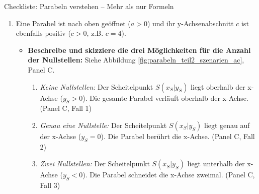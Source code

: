 \begin{loesungsumgebung}{Checkliste: Parabeln verstehen – Mehr als nur Formeln}
\begin{enumerate}[label=\textbf{Teil \arabic*:}]
\begin{enumerate}[label=(\alph*)]
\begin{itemize}
            \item \textbf{Kannst du mit Sicherheit sagen, ob diese Parabel Nullstellen hat?} \\
            \textbf{Ja}, sie muss zwei verschiedene Nullstellen besitzen.
            \textit{Begründung:} Da $a<0$ (nach unten geöffnet) und $f(0)=c=3$ (positiv) ist, liegt der y-Achsenabschnitt oberhalb der x-Achse. Der Scheitelpunkt $S(x_S|y_S)$ als höchster Punkt muss $y_S \ge c = 3$ erfüllen. Da $y_S$ somit positiv ist, muss die nach unten geöffnete Parabel die x-Achse zweimal schneiden.
        \end{itemize}

        \item Eine Parabel ist nach oben geöffnet ($a > 0$) und ihr y-Achsenabschnitt $c$ ist ebenfalls positiv ($c > 0$, z.B. $c=4$).
        \begin{itemize}
            \item \textbf{Beschreibe und skizziere die drei Möglichkeiten für die Anzahl der Nullstellen:} Siehe Abbildung \ref{fig:parabeln_teil2_szenarien_ac}, Panel C.
            \begin{enumerate}
                \item \textit{Keine Nullstellen:} Der Scheitelpunkt $S(x_S|y_S)$ liegt oberhalb der x-Achse ($y_S > 0$). Die gesamte Parabel verläuft oberhalb der x-Achse. (Panel C, Fall 1)
                \item \textit{Genau eine Nullstelle:} Der Scheitelpunkt $S(x_S|y_S)$ liegt genau auf der x-Achse ($y_S = 0$). Die Parabel berührt die x-Achse. (Panel C, Fall 2)
                \item \textit{Zwei Nullstellen:} Der Scheitelpunkt $S(x_S|y_S)$ liegt unterhalb der x-Achse ($y_S < 0$). Die Parabel schneidet die x-Achse zweimal. (Panel C, Fall 3)
            \end{enumerate}


\end{itemize}
\end{enumerate}
\end{enumerate}
\end{loesungsumgebung}

